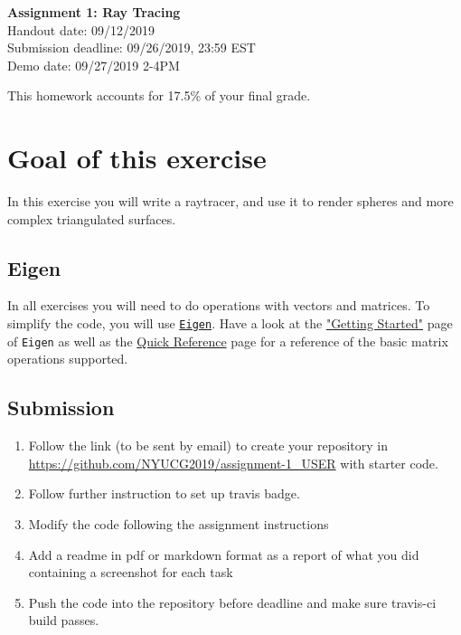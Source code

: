 \documentclass[11pt]{article}
\begin{document}
\hspace{50pt}

\begin{center}

{\Huge \textbf{Assignment 1: Ray Tracing}}\\
\vspace{10pt}
Handout date: 09/12/2019\\
Submission deadline: 09/26/2019,  23:59 EST\\
Demo date: 09/27/2019 2-4PM 
\end{center}

\noindent This homework accounts for 17.5\% of your final grade. 

\section*{Goal of this exercise}
In this exercise you will write a raytracer, and use it to render spheres and more complex triangulated surfaces.

\subsection*{Eigen}
In all exercises you will need to do operations with vectors and matrices. To simplify the code, you will use \href{http://eigen.tuxfamily.org/}{\texttt{Eigen}}. 
Have a look at the \href{http://eigen.tuxfamily.org/dox/GettingStarted.html}{"Getting Started"} page of \texttt{Eigen} as well as the \href{http://eigen.tuxfamily.org/dox/group__QuickRefPage.html}{Quick Reference} page for a reference of the basic matrix operations supported. 

\subsection*{Submission}

\begin{enumerate}
\item Follow the link (to be sent by email) to create your repository in \url{https://github.com/NYUCG2019/assignment-1_USER} with starter code.
\item Follow further instruction to set up travis badge.
\item Modify the code following the assignment instructions
\item Add a readme in pdf or markdown format as a report of what you did containing a screenshot for each task
\item Push the code into the repository before deadline and make sure travis-ci build passes.
\end{enumerate}
\end{document}
